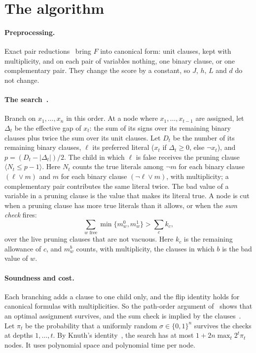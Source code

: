 \documentclass[11pt,a4paper]{article}
\theoremstyle{definition}
\theoremstyle{remark}
\begin{document}
\section{The algorithm}\label{sec:algorithm}

\paragraph{Preprocessing.} Exact pair reductions~\cite{N3} bring $F$ into
canonical form: unit clauses, kept with multiplicity, and on each pair of
variables nothing, one binary clause, or one complementary pair. They change
the score by a constant, so $J$, $h$, $L$ and $d$ do not change.

\paragraph{The search~\cite{N7}.} Branch on $x_1,\dots,x_n$ in this order. At
a node where $x_1,\dots,x_{t-1}$ are assigned, let $\Delta_t$ be the effective
gap of $x_t$: the sum of its signs over its remaining binary clauses plus twice
the sum over its unit clauses. Let $D_t$ be the number of its remaining binary
clauses, $\ell$ its preferred literal ($x_t$ if $\Delta_t\ge0$, else $\neg
x_t$), and $p=(D_t-|\Delta_t|)/2$. The child in which $\ell$ is false receives
the pruning clause $\langle N_t\le p-1\rangle$. Here $N_t$ counts the true
literals among $\neg m$ for each binary clause $(\ell\lor m)$ and $m$ for each
binary clause $(\neg\ell\lor m)$, with multiplicity; a complementary pair
contributes the same literal twice. The bad value of a variable in a pruning
clause is the value that makes its literal true. A node is cut when a pruning
clause has more true literals than it allows, or when the \emph{sum check}
fires:
\[
 \sum_{w\text{ free}}\min\{m^0_w,m^1_w\}>\sum_ck_c ,
\]
over the live pruning clauses that are not vacuous. Here $k_c$ is the remaining
allowance of $c$, and $m^b_w$ counts, with multiplicity, the clauses in which
$b$ is the bad value of $w$.

\paragraph{Soundness and cost.} Each branching adds a clause to one child
only, and the flip identity holds for canonical formulas with multiplicities.
So the path-order argument of~\cite[Proposition~20]{N3} shows that an optimal
assignment survives, and the sum check is implied by the clauses~\cite{N4}.
Let $\pi_t$ be the probability that a uniformly random $\sigma\in\{0,1\}^n$
survives the checks at depths $1,\dots,t$. By Knuth's
identity~\cite{Knu75,N7}, the search has at most $1+2n\max_t2^t\pi_t$ nodes. It
uses polynomial space and polynomial time per node.
\end{document}
